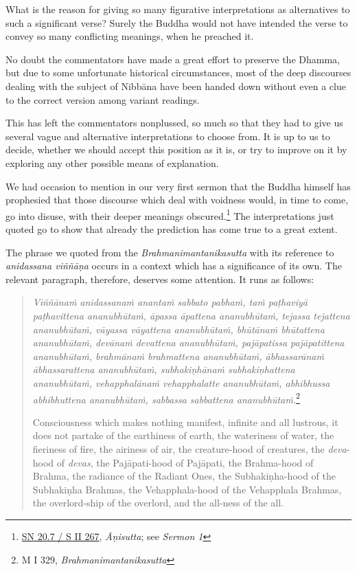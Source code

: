 What is the reason for giving so many figurative interpretations as alternatives to such a significant verse? Surely the Buddha would not have intended the verse to convey so many conflicting meanings, when he preached it.

No doubt the commentators have made a great effort to preserve the Dhamma, but due to some unfortunate historical circumstances, most of the deep discourses dealing with the subject of Nibbāna have been handed down without even a clue to the correct version among variant readings.

This has left the commentators nonplussed, so much so that they had to give us several vague and alternative interpretations to choose from. It is up to us to decide, whether we should accept this position as it is, or try to improve on it by exploring any other possible means of explanation.

We had occasion to mention in our very first sermon that the Buddha himself has prophesied that those discourse which deal with voidness would, in time to come, go into disuse, with their deeper meanings obscured.\footnote{\href{https://suttacentral.net/sn20.7/pli/ms}{SN 20.7 / S II 267}, \emph{Āṇisutta}; see \emph{Sermon 1}} The interpretations just quoted go to show that already the prediction has come true to a great extent.

The phrase we quoted from the \emph{Brahmanimantanikasutta} with its reference to \emph{anidassana viññāṇa} occurs in a context which has a significance of its own. The relevant paragraph, therefore, deserves some attention. It runs as follows:

\begin{quote}
\emph{Viññānaṁ anidassanaṁ anantaṁ sabbato pabhaṁ, taṁ paṭhaviyā paṭhavittena ananubhūtaṁ, āpassa āpattena ananubhūtaṁ, tejassa tejattena ananubhūtaṁ, vāyassa vāyattena ananubhūtaṁ, bhūtānaṁ bhūtattena ananubhūtaṁ, devānaṁ devattena ananubhūtaṁ, pajāpatissa pajāpatittena ananubhūtaṁ, brahmānaṁ brahmattena ananubhūtaṁ, ābhassarānaṁ ābhassarattena ananubhūtaṁ, subhakiṇhānaṁ subhakiṇhattena ananubhūtaṁ, vehapphalānaṁ vehapphalatte ananubhūtaṁ, abhibhussa abhibhuttena ananubhūtaṁ, sabbassa sabbattena ananubhūtaṁ.}\footnote{M I 329, \emph{Brahmanimantanikasutta}}

Consciousness which makes nothing manifest, infinite and all lustrous, it does not partake of the earthiness of earth, the wateriness of water, the fieriness of fire, the airiness of air, the creature-hood of creatures, the \emph{deva}-hood of \emph{devas}, the Pajāpati-hood of Pajāpati, the Brahma-hood of Brahma, the radiance of the Radiant Ones, the Subhakiṇha-hood of the Subhakiṇha Brahmas, the Vehapphala-hood of the Vehapphala Brahmas, the overlord-ship of the overlord, and the all-ness of the all.
\end{quote}

